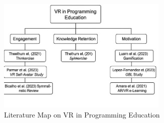 \documentclass[conference]{IEEEtran}
\begin{document}
\begin{figure}[htbp]
    \centering
    \includegraphics[width=\linewidth]{LiteratureMap.jpg}
    \caption{Literature Map on VR in Programming Education}
    \label{fig:literaturemap}
\end{figure}
\end{document}
